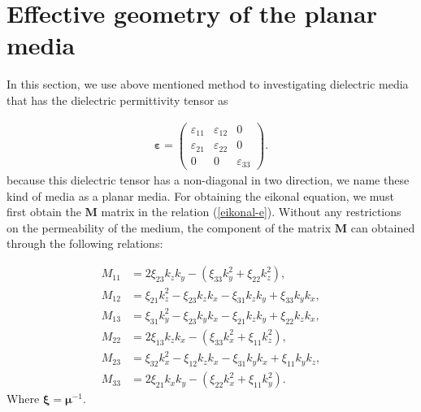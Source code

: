 \documentclass[9pt,twocolumn,twoside]{osajnl}
\begin{document}
\section{Effective geometry of the planar media}\label{planar media}

In this section, we use above mentioned method to investigating dielectric media that has the dielectric permittivity tensor as

\begin{align}\label{planar1}
        \boldsymbol{\varepsilon}=
        \begin{pmatrix}
             \varepsilon_{11} &\varepsilon_{12} &0 \\
            \varepsilon_{21}&\varepsilon_{22}  &0\\
            0&0 &\varepsilon_{33}
        \end{pmatrix}.
\end{align}
because this dielectric tensor has a non-diagonal in two direction, we name these kind of media as a planar media.
For obtaining the eikonal equation, we must first obtain the $\mathbf{M}$  matrix in the relation (\ref{eikonal-e}). 
Without any restrictions on the permeability of the medium, the component of the matrix $\mathbf{M}$ can obtained through the following relations:

\begin{align}
M_{11}&=2\xi_{23}k_{z}k_{y}-(\xi_{33}k_{y}^{2}+\xi_{22}k_{z}^{2}), \nonumber\\
M_{12}&=\xi_{21}k_{z}^{2}-\xi_{23}k_{z}k_{x}-\xi_{31}k_{z}k_{y}+\xi_{33}k_{y}k_{x}, \nonumber\\
M_{13}&=\xi_{31}k_{y}^{2}-\xi_{23}k_{y}k_{x}-\xi_{21}k_{z}k_{y}+\xi_{22}k_{z}k_{x}, \nonumber\\
M_{22}&=2\xi_{13}k_{z}k_{x}-(\xi_{33}k_{x}^{2}+\xi_{11}k_{z}^{2}), \nonumber\\
M_{23}&=\xi_{32}k_{x}^{2}-\xi_{12}k_{z}k_{x}-\xi_{31}k_{y}k_{x}+\xi_{11}k_{y}k_{z},\nonumber\\
M_{33}&=2\xi_{21}k_{x}k_{y}-(\xi_{22}k_{x}^{2}+\xi_{11}k_{y}^{2}).
\end{align}
Where $\boldsymbol{\xi}=\boldsymbol{\mu}^{-1}$. 
\end{document}
